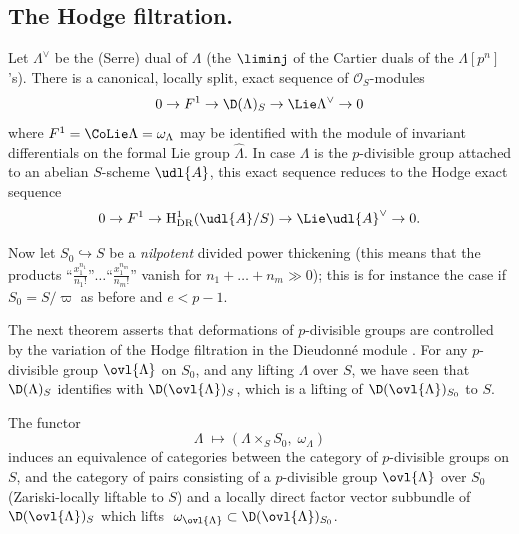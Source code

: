 \subsection{The Hodge filtration.}\label{sub:3.3}

\begin{para}\label{para:3.3.1}
 Let $\Lambda^\vee$ be the (Serre) dual of $\Lambda$ (the $\liminj$ of
 the Cartier duals of the $\Lambda[p^n]$'s). There is a canonical,
 locally split, exact sequence of $\mathcal{O}_S$-modules
 \begin{equation*}
  0\rightarrow F^1\rightarrow {\D}(\Lambda)_S\rightarrow
   \Lie \Lambda^\vee\rightarrow 0
 \end{equation*}
 where $F^1=\CoLie \Lambda=\omega_\Lambda$ may be identified with the
 module of invariant differentials on the formal Lie group
 $\hat\Lambda$. In case $\Lambda$ is the $p$-divisible group attached to
 an abelian $S$-scheme $\udl{A}$, this exact sequence reduces to the
 Hodge exact sequence
 \begin{equation*}
  0\rightarrow F^1\rightarrow \mathrm{H}^1_{\mathrm{DR}}(\udl{A}/S)\rightarrow
   \Lie \udl{A}^\vee\rightarrow 0.
 \end{equation*}
\end{para}

\begin{para}\label{para:3.3.2}
 Now let $S_0\hookrightarrow S$ be a {\it nilpotent} divided power
 thickening (this means that the products
 ``$\frac{x_1^{n_1}}{{n_1}!}$''$\ldots$``$\frac{x_1^{n_m}}{{n_m}!}$'' vanish
 for $n_1+\ldots+n_m\gg 0$); this is for instance the case if
 $S_0=S/\varpi$ as before and $e<p-1$.


 The next theorem asserts that deformations of $p$-divisible
 groups are controlled by the variation of the Hodge filtration in the
 Dieudonn\'e module \cite{messing72:_barsot_tate}. For any $p$-divisible group
 $\ovl{\Lambda}$ on $S_0$, and any lifting $\Lambda$ over $S$, we have
 seen that ${\D}(\Lambda)_S$ identifies with ${\D}(\ovl{\Lambda})_S$,
 which is a lifting of ${\D}(\ovl{\Lambda})_{S_0}$ to $S$.
\end{para}

\begin{thm}\label{thm:3.3.3}
 The functor
 \begin{equation*}
  \Lambda\;\mapsto (\Lambda\times_S S_0,\;\omega_\Lambda)
 \end{equation*}
 induces an equivalence of categories between the category of
 $p$-divisible groups on $S$, and the category of pairs consisting of a
 $p$-divisible group $\ovl{\Lambda}$ over $S_0$ (Zariski-locally liftable
 to $S$) and a locally direct factor vector subbundle of
 ${\D}(\ovl{\Lambda})_S$ which lifts $\;\omega_{\ovl{\Lambda}}\subset
{\D}(\ovl{\Lambda})_{S_0}$.
\end{thm}


